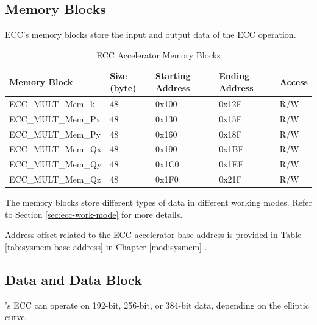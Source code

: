 \documentclass[main\_\_EN.tex]{subfiles}
\begin{document}
\subsection{Memory Blocks}

ECC's memory blocks store the input and output data of the ECC operation.

\begin{table}[H]
    \centering
    \caption{ECC Accelerator Memory Blocks} \label{tab:ecc-memory}
    \begin{threeparttable}
    \begin{tabular}{ | l | l | l | l | l | }
    \hline
        \rowcolor{lightgray}
        \textbf{Memory Block\tnote{1}} & \textbf{Size (byte)}  &  \textbf{Starting Address}\tnote{2} &  \textbf{Ending Address} \tnote{2} & \textbf{Access}   \\ \hline
        ECC\_MULT\_Mem\_k    & 48  & 0x100 & 0x12F & R/W \\ \hline
        ECC\_MULT\_Mem\_Px   & 48  & 0x130 & 0x15F & R/W \\ \hline
        ECC\_MULT\_Mem\_Py   & 48  & 0x160 & 0x18F & R/W \\ \hline
        ECC\_MULT\_Mem\_Qx   & 48  & 0x190 & 0x1BF & R/W \\ \hline
        ECC\_MULT\_Mem\_Qy   & 48  & 0x1C0 & 0x1EF & R/W \\ \hline
        ECC\_MULT\_Mem\_Qz   & 48  & 0x1F0 & 0x21F & R/W \\ \hline
    \end{tabular}
    \begin{tablenotes}
        \item[1] The memory blocks store different types of data in different working modes. Refer to Section \ref{sec:ecc-work-mode} for more details.
        \item[2] Address offset related to the ECC accelerator base address is provided in Table \ref{tab:sysmem-base-address} in Chapter \ref{mod:sysmem} \textit{}.
    \end{tablenotes}
    \end{threeparttable}
\end{table}



\subsection{Data and Data Block}

\chipname{}'s ECC can operate on 192-bit, 256-bit, or 384-bit data, depending on the elliptic curve.
\end{document}
